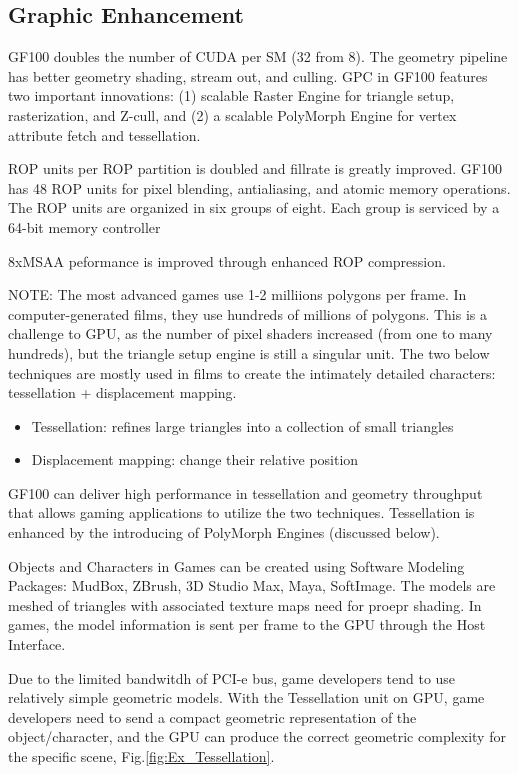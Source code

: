 \subsection{Graphic Enhancement}
\label{sec:Fermi_graphics-enhancement}

GF100 doubles the number of CUDA per SM (32 from 8). The geometry pipeline has
better geometry shading, stream out, and culling. GPC in GF100 features two
important innovations: (1) scalable Raster Engine for triangle setup,
rasterization, and Z-cull, and (2) a scalable PolyMorph Engine for vertex
attribute fetch and tessellation.

ROP units per ROP partition is doubled and fillrate is greatly improved. GF100
has 48 ROP units for pixel blending, antialiasing, and atomic memory operations.
The ROP units are organized in six groups of eight. Each group is serviced by a
64-bit memory controller

8xMSAA peformance is improved through enhanced ROP compression.

NOTE: The most advanced games use 1-2 milliions polygons per frame. In
computer-generated films, they use hundreds of millions of polygons. This is a
challenge to GPU, as the number of pixel shaders increased (from one to many
hundreds), but the triangle setup engine is still a singular unit. The two below
techniques are mostly used in films to create the intimately detailed
characters: tessellation + displacement mapping.
\begin{itemize}
  \item Tessellation: refines large triangles into a collection of small
  triangles
  \item Displacement mapping: change their relative position
\end{itemize}
GF100 can deliver high performance in tessellation and geometry throughput that
allows gaming applications to utilize the two techniques. Tessellation is
enhanced by the introducing of PolyMorph Engines (discussed below).

\begin{framed}
Objects and Characters in Games can be created using Software Modeling Packages:
MudBox, ZBrush, 3D Studio Max, Maya, SoftImage. The models are meshed of
triangles with associated texture maps need for proepr shading. In games, the
model information is sent per frame to the GPU through the Host Interface. 

Due to the limited bandwitdh of PCI-e bus, game developers tend to use
relatively simple geometric models. With the Tessellation unit on GPU, game
developers need to send a compact geometric representation of the
object/character, and the GPU can produce the correct geometric complexity for
the specific scene, Fig.\ref{fig:Ex_Tessellation}.
\end{framed}

